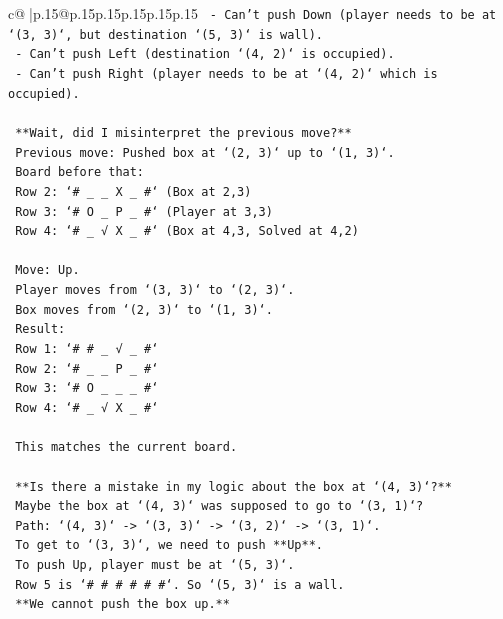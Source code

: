 \documentclass{article}
\begin{document}
{\begin{supertabular}{c@{$\;$}|p{.15\linewidth}@{}p{.15\linewidth}p{.15\linewidth}p{.15\linewidth}p{.15\linewidth}p{.15\linewidth}}
{{{\texttt{    {-} Can't push Down (player needs to be at `(3, 3)`, but destination `(5, 3)` is wall).} \\
\texttt{    {-} Can't push Left (destination `(4, 2)` is occupied).} \\
\texttt{    {-} Can't push Right (player needs to be at `(4, 2)` which is occupied).} \\
\\ 
\texttt{    **Wait, did I misinterpret the previous move?**} \\
\texttt{    Previous move: Pushed box at `(2, 3)` up to `(1, 3)`.} \\
\texttt{    Board before that:} \\
\texttt{    Row 2: `\# \_ \_ X \_ \#` (Box at 2,3)} \\
\texttt{    Row 3: `\# O \_ P \_ \#` (Player at 3,3)} \\
\texttt{    Row 4: `\# \_ √ X \_ \#` (Box at 4,3, Solved at 4,2)} \\
\\ 
\texttt{    Move: Up.} \\
\texttt{    Player moves from `(3, 3)` to `(2, 3)`.} \\
\texttt{    Box moves from `(2, 3)` to `(1, 3)`.} \\
\texttt{    Result:} \\
\texttt{    Row 1: `\# \# \_ √ \_ \#`} \\
\texttt{    Row 2: `\# \_ \_ P \_ \#`} \\
\texttt{    Row 3: `\# O \_ \_ \_ \#`} \\
\texttt{    Row 4: `\# \_ √ X \_ \#`} \\
\\ 
\texttt{    This matches the current board.} \\
\\ 
\texttt{    **Is there a mistake in my logic about the box at `(4, 3)`?**} \\
\texttt{    Maybe the box at `(4, 3)` was supposed to go to `(3, 1)`?} \\
\texttt{    Path: `(4, 3)` {-}> `(3, 3)` {-}> `(3, 2)` {-}> `(3, 1)`.} \\
\texttt{    To get to `(3, 3)`, we need to push **Up**.} \\
\texttt{    To push Up, player must be at `(5, 3)`.} \\
\texttt{    Row 5 is `\# \# \# \# \# \#`. So `(5, 3)` is a wall.} \\
\texttt{    **We cannot push the box up.**} \\
}}}
\end{supertabular}}
\end{document}
